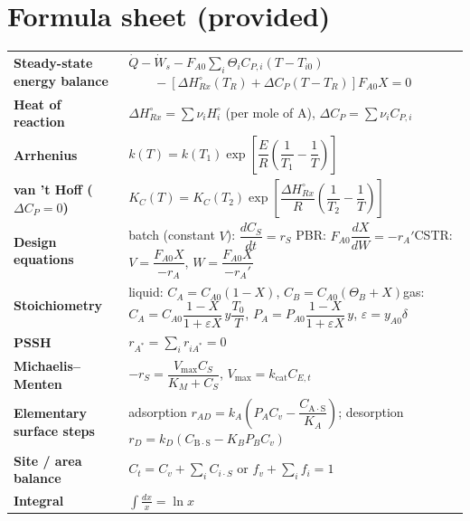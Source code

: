 \documentclass[11pt]{article}
\newcommand{\AS}[1]{\mathrm{#1\!\cdot\!S}}
\begin{document}
\section*{Formula sheet (provided)}
\renewcommand{\arraystretch}{2.0}
\begin{tabular}{@{}>{\bfseries}p{3.8cm} >{\raggedright\arraybackslash}p{12.4cm}@{}}
\toprule
Steady-state energy balance & $\dot Q-\dot W_s-F_{A0}\sum_i\Theta_iC_{P,i}(T-T_{i0})$\newline $\qquad-\left[\Delta H^\circ_{Rx}(T_R)+\Delta C_P(T-T_R)\right]F_{A0}X=0$\\
Heat of reaction & $\Delta H^\circ_{Rx}=\sum\nu_iH_i^\circ$ \;(per mole of A), \quad $\Delta C_P=\sum\nu_iC_{P,i}$\\
Arrhenius & $k(T)=k(T_1)\exp\!\left[\dfrac{E}{R}\left(\dfrac{1}{T_1}-\dfrac{1}{T}\right)\right]$\\
van 't Hoff ($\Delta C_P=0$) & $K_C(T)=K_C(T_2)\exp\!\left[\dfrac{\Delta H^\circ_{Rx}}{R}\left(\dfrac{1}{T_2}-\dfrac{1}{T}\right)\right]$\\
Design equations & batch (constant $V$): $\dfrac{dC_S}{dt}=r_S$ \qquad PBR: $F_{A0}\dfrac{dX}{dW}=-r_A'$\newline CSTR: $V=\dfrac{F_{A0}X}{-r_A}$, \; $W=\dfrac{F_{A0}X}{-r_A'}$\\
Stoichiometry & liquid: $C_A=C_{A0}(1-X)$, \; $C_B=C_{A0}(\Theta_B+X)$\newline gas: $C_A=C_{A0}\dfrac{1-X}{1+\varepsilon X}\,y\dfrac{T_0}{T}$, \; $P_A=P_{A0}\dfrac{1-X}{1+\varepsilon X}\,y$, \; $\varepsilon=y_{A0}\delta$\\
PSSH & $r_{A^*}=\sum_ir_{iA^*}=0$\\
Michaelis--Menten & $-r_S=\dfrac{V_{\max}C_S}{K_M+C_S}$, \qquad $V_{\max}=k_{\text{cat}}C_{E,t}$\\
Elementary surface steps & adsorption $r_{AD}=k_A\left(P_AC_v-\dfrac{C_{\AS{A}}}{K_A}\right)$; \;
desorption $r_D=k_D\left(C_{\AS{B}}-K_BP_BC_v\right)$\\
Site / area balance & $C_t=C_v+\sum_iC_{i\cdot S}$ \qquad or \qquad $f_v+\sum_if_i=1$\\
Integral & $\displaystyle\int\frac{dx}{x}=\ln x$\\
\bottomrule
\end{tabular}
\end{document}
